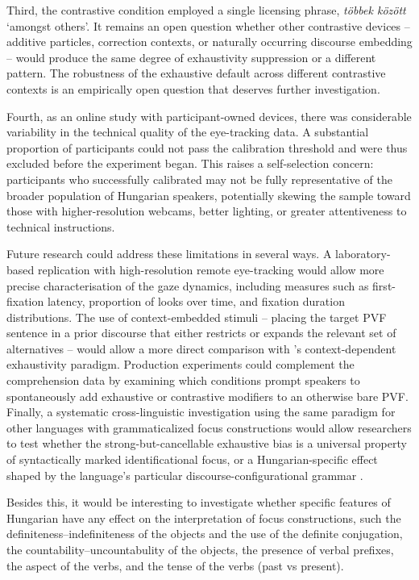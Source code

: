 \documentclass[a4paper, ruler]{CUP-JNL-LIN}%
\begin{document}
Third, the contrastive condition employed a single licensing phrase, \textit{többek között} `amongst others'. It remains an open question whether other contrastive devices -- additive particles, correction contexts, or naturally occurring discourse embedding -- would produce the same degree of exhaustivity suppression or a different pattern. The robustness of the exhaustive default across different contrastive contexts is an empirically open question that deserves further investigation.

Fourth, as an online study with participant-owned devices, there was considerable variability in the technical quality of the eye-tracking data. A substantial proportion of participants could not pass the calibration threshold and were thus excluded before the experiment began. This raises a self-selection concern: participants who successfully calibrated may not be fully representative of the broader population of Hungarian speakers, potentially skewing the sample toward those with higher-resolution webcams, better lighting, or greater attentiveness to technical instructions.

Future research could address these limitations in several ways. A laboratory-based replication with high-resolution remote eye-tracking would allow more precise characterisation of the gaze dynamics, including measures such as first-fixation latency, proportion of looks over time, and fixation duration distributions. The use of context-embedded stimuli -- placing the target PVF sentence in a prior discourse that either restricts or expands the relevant set of alternatives -- would allow a more direct comparison with \citet{kaldi_2018_linguistic}'s context-dependent exhaustivity paradigm. Production experiments could complement the comprehension data by examining which conditions prompt speakers to spontaneously add exhaustive or contrastive modifiers to an otherwise bare PVF. Finally, a systematic cross-linguistic investigation using the same paradigm for other languages with grammaticalized focus constructions \citep[cf.][]{hsu_2019_associations,cruschina_2021_greater} would allow researchers to test whether the strong-but-cancellable exhaustive bias is a universal property of syntactically marked identificational focus, or a Hungarian-specific effect shaped by the language's particular discourse-configurational grammar \citep{ekiss_1995_discourse}.

Besides this, it would be interesting to investigate whether specific features of Hungarian have any effect on the interpretation of focus constructions, such the definiteness--indefiniteness of the objects and the use of the definite conjugation, the countability--uncountabulity of the objects, the presence of verbal prefixes, the aspect of the verbs, and the tense of the verbs (past vs present).  
\end{document}
